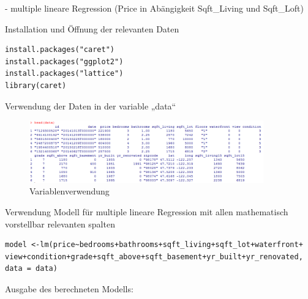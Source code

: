 - multiple lineare Regression (Price in Abängigkeit Sqft\_Living und Sqft\_Loft)

Installation und Öffnung der relevanten Daten
\begin{lstlisting}
install.packages("caret")
install.packages("ggplot2")
install.packages("lattice")
library(caret)
\end{lstlisting}

Verwendung der Daten in der variable „data“

\begin{figure}[!htb]
        \begin{minipage}{1\textwidth}
                \centering
                \includegraphics[width=0.90\textwidth]{pics/tutor7.png}\par\vspace{0cm}
                \caption{Variablenverwendung}
                \label{fig:tutor7}
        \end{minipage}
\end{figure}

Verwendung Modell für multiple lineare Regression mit allen mathematisch        vorstellbar relevanten spalten
\begin{lstlisting}
model <-lm(price~bedrooms+bathrooms+sqft_living+sqft_lot+waterfront+    view+condition+grade+sqft_above+sqft_basement+yr_built+yr_renovated,    data = data)
\end{lstlisting}

        Ausgabe des berechneten Modells:


